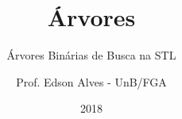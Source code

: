 \title{Árvores}
\subtitle{Árvores Binárias de Busca na STL}
\author{Prof. Edson Alves - UnB/FGA}
\date{2018}
